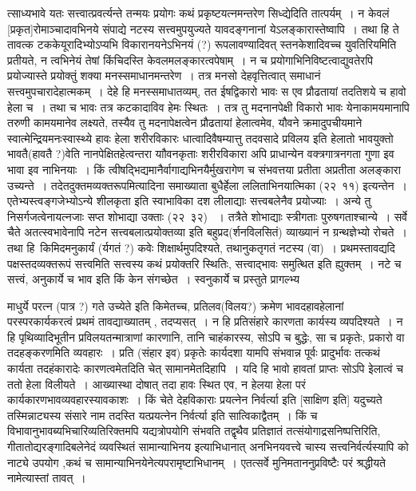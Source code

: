 \documentclass[11pt, openany]{book}
\begin{document}
\noindent
त्साध्यभावे यतः सत्त्वात्प्रवर्त्यन्ते तन्मयः प्रयोगः कथं प्रकृष्टयत्नमन्तरेण सिध्द्येदिति तात्पर्यम्~। न केवलं [प्रकृत]रोमाञ्चादावभिनये संपाद्ये नटस्य सत्त्वमुपयुज्यते यावदङ्गनानां येऽलङ्कारास्तेष्वापि~। तथा हि ते तावत्क टककेयूरादिभ्योऽप्यभि विकारानयनेऽभिनयं (?) रूपलावण्यादिवत् स्तनकेशादिवच्च युवतिरियमिति प्रतीयते, न त्वभिनेयं तेषां किंचिदस्ति केवलमलङ्कारत्वपेषाम्~। न च प्रयोगाभिनिविष्टत्वाद्युवतेरपि प्रयोज्यास्ते प्रयोक्तुं शक्या मनस्समाधानमन्तरेण~। तत्र मनसो देहवृत्तित्वात् समाधानं सत्त्वमुपचारादेहात्मकम्~। देहे हि मनस्समाधातव्यम्, तत ईषद्विकारो भावः स एव प्रौढतायां तदतिशये च हावो हेला च~। तथा च भावः तत्र कटकादाविव हेमः स्थितः~। तत्र तु मदनानपेक्षी विकारो भावः येनाकामयमानापि तरुणी कामयमानेव लक्ष्यते, तस्यैव तु मदनापेक्षत्वेन प्रौढतायां हेलात्वमेव, यौवने क्रमादुपचीयमाने स्वात्मेन्द्रियमनःस्वास्थ्ये हावः हेला शरीरविकारः धात्वादिवैषम्यात्तु तदवसादे प्रविलय इति हेलातो भावयुक्तो भावतै(हावतै ?)वेति नानपेक्षितहेत्वन्तरा याौवनकृताः शरीरविकारा अपि प्राधान्येन वक्त्रगात्रनगता गुणा इव भावा इव नाभिनयाः~। किं त्वीषद्भिद्यमानैर्वागाद्यभिनयैर्मुखरागेण च संभवत्तया प्रतीता अप्रतीता अलङ्कारा उच्यन्ते~। तदेतदुक्तमव्यक्तरूपमित्यादिना समाख्याता बुधैर्हेला ललिताभिनयात्मिका (२२\textendash\ ११) इत्यन्तेन~। एतेभ्यस्त्वङ्गजेभ्योऽन्ये शीलकृता इति स्वाभाविका दश लीलाद्याः सत्त्वबलेनैव प्रयोज्याः~। अन्ये तु निसर्गजत्वेनायत्नजाः सप्त शोभाद्या उक्ताः (२२\textendash\ ३२) ~। तत्रैते शोभाद्याः स्त्रीगताः पुरुषगताश्चान्ये~। सर्वे चैते अतत्स्वभावेनापि नटेन सत्त्वबलात्प्रयोक्तव्या इति बहुप्रद(र्शनविलसितं) व्याख्यानं न ग्रन्थज्ञेभ्यो रोचते~। \\

तथा हि\textendash\ किमिदमनुकार्यं (र्यगतं ?) कवेः शिक्षार्थमुपदिश्यते, तथानुकतृगतं नटस्य (वा)~। प्रथमस्तावद्यदि पक्षस्तदव्यक्तरूपं सत्त्वमिति सत्त्वस्य कथं प्रयोक्तरि स्थितिः, सत्त्वाद्भावः समुत्थित इति ह्युक्तम्~। नटे च सत्त्वं, अनुकार्ये च भाव इति किं केन संगच्छेत~। स्वनुकार्ये च प्रस्तुते प्रागल्भ्य\textendash\ 

\newpage

\noindent
माधुर्ये परत्न (पात्र ?) गते उच्येते इति किमेतच्च, प्रतिलव(विलय?) क्रमेण भावदहावहेलानां परस्परकार्यकरत्वं प्रथमं तावद्याख्यातम् , तदप्यसत्~। न हि प्रतिसंहारे कारणता कार्यस्य व्यपदिश्यते~। न हि पृथिव्यादिभूतीन प्रविलयतन्मात्राणां कारणानि, तानि चाहंकारस्य, सोऽपि च बुद्धेः, सा च प्रकृतेः, प्रकारो वा तदहङ्करणमिति व्यवहारः~। प्रति (संहार इव) प्रकृतेः कार्यदशा यामपि संभवान्न पूर्वः प्रादुर्भावः तत्कथं कार्यता तदहंकारादेः कारणत्वमेतदिति चेत् सामानमेतदिहापि~। यदि हि भावो हावतां प्राप्तः सोऽपि इेलात्वं च ततो हेला विलीयते~। आख्यास्था दोषात् तदा हावः स्थित एव, न हेलया हेला परं कार्यकारणभावव्यवहारस्यावकाशः~। किं चेते देहविकाराः प्रयत्नेन निर्वर्त्या इति [साक्षिण इति] यदुच्यते तस्मिन्नाट्यस्य संसारे नाम तदस्ति यत्प्रयत्नेन निर्वर्त्या इति सात्विकाद्वैतम्~। किं च विभावानुभावब्यभिचारिव्यतिरिक्तमपि यद्यत्रोपयोगि संभवति तद्वृथैव प्रतिज्ञातं तत्संयोगाद्रसनिष्पत्तिरिति, गीतातोद्यरङ्गादिबलेनेदं व्यवस्थितं सामान्याभिनय इत्याभिधानात् अनभिनयवत्त्वे चास्य सत्त्वनिर्वर्त्यस्यापि को नाट्ये उपयोग ,कथं च सामान्याभिनयेनेत्यपरामृष्टाभिधानम्~। एतत्सर्वे मुनिमताननुप्रविष्टैः परं श्रद्धीयते नामेत्यास्तां तावत्~। \\
\end{document}
